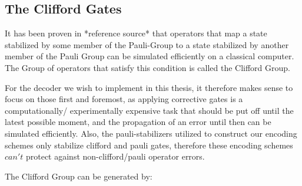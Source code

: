 \subsection{The Clifford Gates}

It has been proven in *reference source* that operators that 
map a state stabilized by some member of the Pauli-Group to 
a state stabilized by another member of the Pauli Group can be simulated efficiently
on a classical computer. The Group of operators that satisfy
this condition is called the Clifford Group.

For the decoder we wish to implement in
this thesis, it therefore makes sense to focus on those first and
foremost, as applying corrective gates is a computationally/
experimentally expensive task that should be put off until the latest
possible moment, and the propagation of an error until then can be
simulated efficiently. Also, the pauli-stabilizers utilized to construct our
encoding schemes only stabilize clifford and pauli gates, therefore these encoding
schemes $can't$ protect against non-clifford/pauli operator errors. 

The Clifford Group can be generated by:

